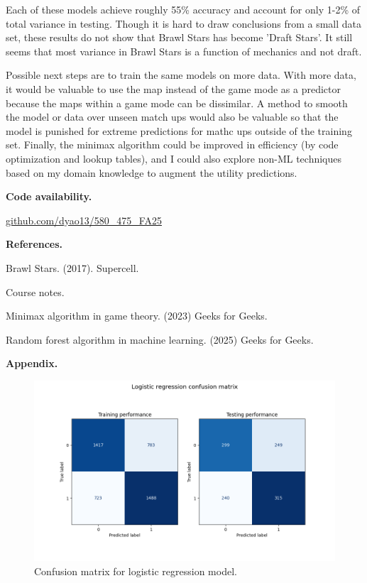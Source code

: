 \documentclass[12pt]{article}
\begin{document}
Each of these models achieve roughly 55\% accuracy and account for only 1-2\% of total variance in testing. Though it is hard to draw conclusions from a small data set, these results do not show that Brawl Stars has become 'Draft Stars'. It still seems that most variance in Brawl Stars is a function of mechanics and not draft.

Possible next steps are to train the same models on more data. With more data, it would be valuable to use the map instead of the game mode as a predictor because the maps within a game mode can be dissimilar. A method to smooth the model or data over unseen match ups would also be valuable so that the model is punished for extreme predictions for mathc ups outside of the training set. Finally, the minimax algorithm could be improved in efficiency (by code optimization and lookup tables), and I could also explore non-ML techniques based on my domain knowledge to augment the utility predictions.

\textbf{Code availability.}

\href{https://github.com/dyao13/580_475_FA25}{github.com/dyao13/580\_475\_FA25}

\newpage \textbf{References.}

Brawl Stars. (2017). Supercell.

Course notes.

Minimax algorithm in game theory. (2023) Geeks for Geeks.

Random forest algorithm in machine learning. (2025) Geeks for Geeks.

\newpage \textbf{Appendix.}

\begin{figure}[h!]
\centering
\begin{center} \includegraphics[width=6in]{"../output/lr_confusion_matrix.png"} \end{center}
\caption{Confusion matrix for logistic regression model.}
\label{fig:lr-cm}
\end{figure}
\end{document}
